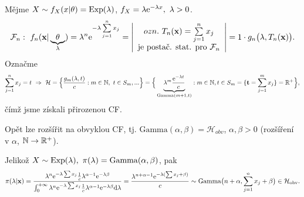 \begin{example}
	Mějme $X\sim f_X(x|\theta)=\mathrm{Exp}(\lambda)$, $f_X=\lambda\mathrm{e}^{-\lambda x},~\lambda>0$. $$\mathcal{F}_n: ~f_n(\textbf{x}|\underbrace{\theta}_{\lambda})=\lambda^n\mathrm{e}^{-\lambda\sum\limits_{j=1}^{n} x_j}=\left|\begin{array}{c}
	ozn.~T_n(\textbf{x})=\sum\limits_{j=1}^{n} x_j\\\text{je postač. stat. pro }\mathcal{F}_n
\end{array}
\right|=1\cdot g_n\big(\lambda,T_n(\textbf{x})\big).$$
Označme $$\sum\limits_{j=1}^{n} x_j=t~\Rightarrow~\mathcal{H}=\Big\{ \frac{g_m(\lambda,t)}{c}:m\in\mathbb{N},~t\in S_m,... \Big\}=\Big\{\underbrace{\lambda^m\frac{\mathrm{e}^{-\lambda t}}{c}}_{\mathrm{Gamma}(m+1,t)}:m\in\mathbb{N},t\in S_m=\{\textbf{t}=\sum_{j=1}^m x_j \}=\mathbb{R}^+\Big\},$$
čímž jsme získali přirozenou CF.

Opět lze rozšířit na obvyklou CF, tj. $\mathrm{Gamma}(\alpha,\beta)=\mathcal{H}_{obv}$, $\alpha,\beta >0$ (rozšíření v $\alpha$, $\mathbb{N}\rightarrow \mathbb{R}^{+}$).

Jelikož $X\sim\mathrm{Exp}(\lambda),~\pi(\lambda)=\mathrm{Gamma}(\alpha,\beta)$, pak 
$$ \pi(\lambda|\textbf{x})=\frac{\lambda^n\mathrm{e}^{-\lambda\sum x_j}\frac{1}{c}\lambda^{\alpha-1}\mathrm{e}^{-\lambda\beta}}{\int_{0}^{+\infty}\lambda^n\mathrm{e}^{-\lambda\sum x_j}\frac{1}{c}\lambda^{\alpha-1}\mathrm{e}^{-\lambda\beta}\mathrm{d}\lambda}=\frac{\lambda^{n+\alpha-1}\mathrm{e}^{-\lambda(\sum x_j+\beta)}}{c}\sim\mathrm{Gamma}\big(n+\alpha,\sum\limits_{j=1}^{n} x_j+\beta\big)\in\mathcal{H}_\text{obv} .$$


\end{example}
